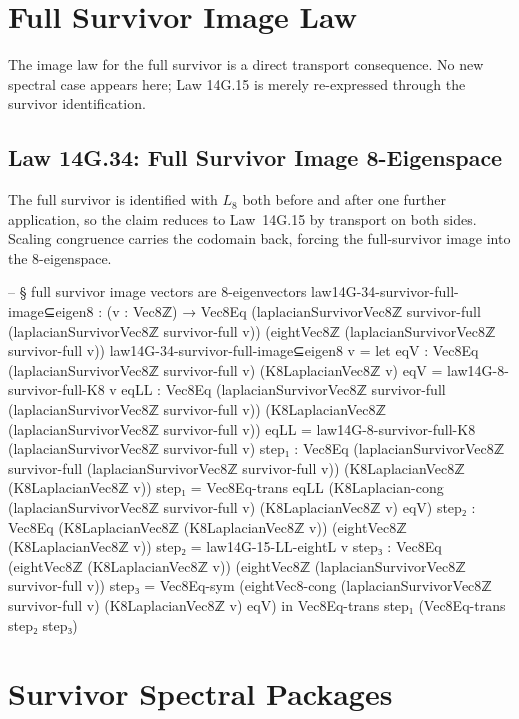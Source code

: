 \documentclass[11pt,a4paper]{book}
\def\subseteq{sub=}%
\def\texorpdfstring#1#2{#2}%
\begin{document}
\section{Full Survivor Image Law}

The image law for the full survivor is a direct transport consequence.
No new spectral case appears here; Law 14G.15 is merely re-expressed through the survivor identification.

\subsection{Law 14G.34: Full Survivor Image \texorpdfstring{$\subseteq$}{} 8-Eigenspace}

The full survivor is identified with $L_8$ both before and after one further application, so the claim reduces to Law~14G.15 by transport on both sides. Scaling congruence carries the codomain back, forcing the full-survivor image into the $8$-eigenspace.

\begin{code}
-- § full survivor image vectors are 8-eigenvectors
law14G-34-survivor-full-image⊆eigen8 : (v : Vec8ℤ) →
  Vec8Eq (laplacianSurvivorVec8ℤ survivor-full (laplacianSurvivorVec8ℤ survivor-full v))
        (eightVec8ℤ (laplacianSurvivorVec8ℤ survivor-full v))
law14G-34-survivor-full-image⊆eigen8 v =
  let eqV : Vec8Eq (laplacianSurvivorVec8ℤ survivor-full v) (K8LaplacianVec8ℤ v)
      eqV = law14G-8-survivor-full-K8 v
      eqLL : Vec8Eq (laplacianSurvivorVec8ℤ survivor-full (laplacianSurvivorVec8ℤ survivor-full v))
                   (K8LaplacianVec8ℤ (laplacianSurvivorVec8ℤ survivor-full v))
      eqLL = law14G-8-survivor-full-K8 (laplacianSurvivorVec8ℤ survivor-full v)
      step₁ : Vec8Eq (laplacianSurvivorVec8ℤ survivor-full (laplacianSurvivorVec8ℤ survivor-full v))
                     (K8LaplacianVec8ℤ (K8LaplacianVec8ℤ v))
      step₁ =
        Vec8Eq-trans
          eqLL
          (K8Laplacian-cong (laplacianSurvivorVec8ℤ survivor-full v) (K8LaplacianVec8ℤ v) eqV)
      step₂ : Vec8Eq (K8LaplacianVec8ℤ (K8LaplacianVec8ℤ v)) (eightVec8ℤ (K8LaplacianVec8ℤ v))
      step₂ = law14G-15-LL-eightL v
      step₃ : Vec8Eq (eightVec8ℤ (K8LaplacianVec8ℤ v)) (eightVec8ℤ (laplacianSurvivorVec8ℤ survivor-full v))
      step₃ = Vec8Eq-sym (eightVec8-cong (laplacianSurvivorVec8ℤ survivor-full v) (K8LaplacianVec8ℤ v) eqV)
  in
  Vec8Eq-trans step₁ (Vec8Eq-trans step₂ step₃)
\end{code}

\section{Survivor Spectral Packages}
\end{document}
